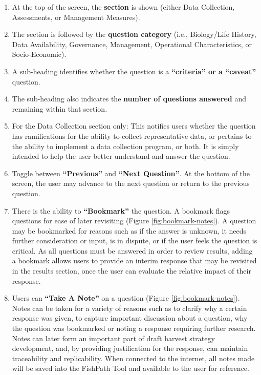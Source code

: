 \documentclass[
  11pt,
]{book}
\providecommand{\tightlist}{%
  \setlength{\itemsep}{0pt}\setlength{\parskip}{0pt}}
\begin{document}
\begin{enumerate}
\def\labelenumi{\arabic{enumi}.}
\tightlist
\item
  At the top of the screen, the \textbf{section} is shown (either Data Collection, Assessments, or Management Measures).
\item
  The section is followed by the \textbf{question category} (i.e., Biology/Life History, Data Availability, Governance, Management, Operational Characteristics, or Socio-Economic).
\item
  A sub-heading identifies whether the question is a \textbf{``criteria'' or a ``caveat''} question.
\item
  The sub-heading also indicates the \textbf{number of questions answered} and remaining within that section.
\item
  For the Data Collection section only: This notifies users whether the question has ramifications for the ability to collect representative data, or pertains to the ability to implement a data collection program, or both. It is simply intended to help the user better understand and answer the question.
\item
  Toggle between \textbf{``Previous''} and \textbf{``Next Question''}. At the bottom of the screen, the user may advance to the next question or return to the previous question.
\item
  There is the ability to \textbf{``Bookmark''} the question. A bookmark flags questions for ease of later revisiting (Figure \ref{fig:bookmark-notes}). A question may be bookmarked for reasons such as if the answer is unknown, it needs further consideration or input, is in dispute, or if the user feels the question is critical. As all questions must be answered in order to review results, adding a bookmark allows users to provide an interim response that may be revisited in the results section, once the user can evaluate the relative impact of their response.
\item
  Users can \textbf{``Take A Note''} on a question (Figure \ref{fig:bookmark-notes}). Notes can be taken for a variety of reasons such as to clarify why a certain response was given, to capture important discussion about a question, why the question was bookmarked or noting a response requiring further research. Notes can later form an important part of draft harvest strategy development, and, by providing justification for the response, can maintain traceability and replicability. When connected to the internet, all notes made will be saved into the FishPath Tool and available to the user for reference.
\end{enumerate}
\end{document}
